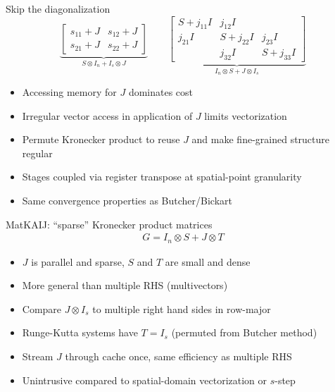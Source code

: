 \documentclass{beamer}
\begin{document}
\begin{frame}{Skip the diagonalization}
  \begin{equation*}
    \underbrace{\begin{bmatrix} s_{11} + J & s_{12} + J \\ s_{21} + J & s_{22} + J \end{bmatrix}}_{S\otimes I_n + I_s \otimes J} \qquad
    \underbrace{\begin{bmatrix} S + j_{11} I & j_{12}I & \\ j_{21}I & S + j_{22}I & j_{23}I \\  & j_{32}I & S + j_{33}I \end{bmatrix}}_{I_n \otimes S + J \otimes I_s}
  \end{equation*}
  \begin{itemize}
  \item Accessing memory for $J$ dominates cost
  \item Irregular vector access in application of $J$ limits vectorization
  \item Permute Kronecker product to reuse $J$ and make fine-grained structure regular
  \item Stages coupled via register transpose at spatial-point granularity
  \item Same convergence properties as Butcher/Bickart
  \end{itemize}
\end{frame}

\begin{frame}{MatKAIJ: ``sparse'' Kronecker product matrices}
  \begin{gather*}
    G = I_n \otimes S + J \otimes T
  \end{gather*}
  \begin{itemize}
  \item $J$ is parallel and sparse, $S$ and $T$ are small and dense
  \item More general than multiple RHS (multivectors)
  \item Compare $J \otimes I_s$ to multiple right hand sides in row-major
  \item Runge-Kutta systems have $T = I_s$ (permuted from Butcher method)
  \item Stream $J$ through cache once, same efficiency as multiple RHS
  \item Unintrusive compared to spatial-domain vectorization or $s$-step
  \end{itemize}
\end{frame}
\end{document}
